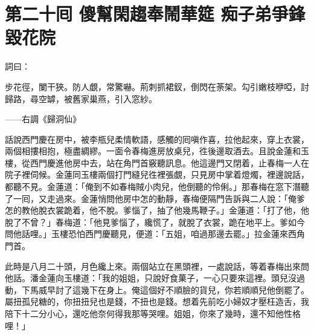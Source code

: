 
\chapter*{第二十囘 傻幫閑趨奉鬧華筵 痴子弟爭鋒毀花院}


詞曰：

步花徑，闌干狹。防人覷，常驚嚇。荊刺抓裙釵，倒閃在荼架。勾引嫩枝咿啞，討歸路，尋空罅，被舊家巢燕，引入窓紗。

——右調《歸洞仙》

話說西門慶在房中，被李瓶兒柔情軟語，{}感觸的囘嗔作喜，拉他起來，穿上衣裳，兩個相摟相抱，極盡綢繆。一面令春梅進房放桌兒，徃後邊取酒去。且說金蓮和玉樓，從西門慶進他房中去，站在角門首竅聽訊息。他這邊門又閉着，止春梅一人在院子裡伺候。金蓮同玉樓兩個打門縫兒徃裡張覷，只見房中掌着燈燭，裡邊說話，都聽不見。金蓮道：「俺到不如春梅賊小肉兒，他倒聽的伶俐。」那春梅在窓下潛聽了一囘，又走過來。金蓮悄問他房中怎的動靜，春梅便隔門告訴與二人說：「俺爹怎的教他脫衣裳跪着，他不脫。爹惱了，抽了他幾馬鞭子。」金蓮道：「打了他，他脫了不曾？」春梅道：「他見爹惱了，纔慌了，就脫了衣裳，跪在地平上。爹如今問他話哩。」玉樓恐怕西門慶聽見，便道：「五姐，咱過那邊去罷。」{}拉金蓮來西角門首。

此時是八月二十頭，月色纔上來。兩個站立在黑頭裡，一處說話，等着春梅出來問他話。潘金蓮向玉樓道：「我的姐姐，只說好食菓子，一心只要來這裡。頭兒沒過動，下馬威早討了這幾下在身上。俺這個好不順臉的貨兒，你若順順兒他倒罷了。屬扭孤兒糖的，你扭扭兒也是錢，不扭也是錢。想着先前吃小婦奴才壓枉造舌，我陪下十二分小心，還吃他奈何得我那等哭哩。姐姐，你來了幾時，還不知他性格哩！」

